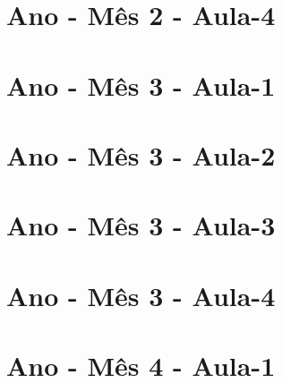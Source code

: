 \begin{multicols}{2}
\section[\sffamily 4\textordmasculine\space Ano - Mês 2 - Aula-4]{\textordmasculine\space Ano - Mês 2 - Aula-4}


\section[\sffamily 4\textordmasculine\space Ano - Mês 3 - Aula-1]{\textordmasculine\space Ano - Mês 3 - Aula-1}


\section[\sffamily 4\textordmasculine\space Ano - Mês 3 - Aula-2]{\textordmasculine\space Ano - Mês 3 - Aula-2}


\section[\sffamily 4\textordmasculine\space Ano - Mês 3 - Aula-3]{\textordmasculine\space Ano - Mês 3 - Aula-3}



\section[\sffamily 4\textordmasculine\space Ano - Mês 3 - Aula-4]{\textordmasculine\space Ano - Mês 3 - Aula-4}


\end{multicols}

\vfill\null
\pagebreak

\section[\sffamily 4\textordmasculine\space Ano - Mês 4 - Aula-1]{\textordmasculine\space Ano - Mês 4 - Aula-1}


